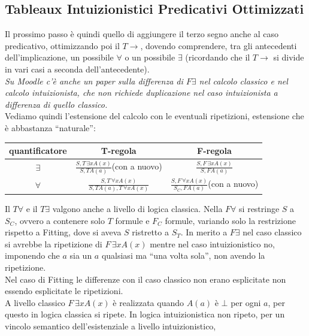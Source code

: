 \documentclass[a4paper,12pt, oneside]{book}
\begin{document}
\subsection{Tableaux Intuizionistici Predicativi Ottimizzati}
Il prossimo passo è quindi quello di aggiungere il terzo segno anche al caso
predicativo, ottimizzando poi il $T\to$, dovendo comprendere, tra gli
antecedenti dell'implicazione, un possibile $\forall$ o un possibile $\exists$
(ricordando che il $T\to$ si divide in vari casi a seconda dell'antecedente).\\
\textit{Su Moodle c'è anche un paper sulla differenza di $F\exists$ nel calcolo
  classico e nel calcolo intuizionista, che non richiede duplicazione nel caso
  intuizionista a differenza di quello classico.}\\
Vediamo quindi l'estensione del calcolo con le eventuali ripetizioni, estensione
che è abbastanza ``naturale'': 
\begin{table}[H]
  \centering
  \Large
  \begin{tabular}{c||c|c}
    quantificatore & T-regola & F-regola\\
    \hline
    $\exists$ & $\frac{S,T\,\exists x A(x)}{S,TA(a)}${\small{(con a nuovo)}}
                              & $\frac{S,F\,\exists x A(x)}{S,FA(a)}$\\
    \hline
    $\forall$ & $\frac{S,T\,\forall x A(x)}{S,TA(a),T\,\forall x A(x)}$
                              & $\frac{S,F\,\forall x A(x)}{S_C,
                                FA(a)}${\small{(con a nuovo)}}\\
    \hline
  \end{tabular}
\end{table}
Il $T\forall$ e il $T\exists$ valgono anche a livello di logica classica. Nella
$F\forall$ si restringe $S$ a $S_C$, ovvero a contenere solo $T$ formule e $F_C$
formule, variando solo la restrizione rispetto a Fitting, dove si aveva $S$
ristretto a $S_T$. In merito a $F\exists$ nel caso classico si avrebbe la
ripetizione di $F\,\exists x A(x)$ mentre nel caso intuizionistico no, imponendo
che $a$ sia un $a$ qualsiasi ma ``una volta sola'', non avendo la ripetizione.\\
Nel caso di Fitting le differenze con il caso classico non erano esplicitate non
essendo esplicitate le ripetizioni.\\
A livello classico $F\,\exists x A(x)$ è realizzata quando $A(a)$ è $\bot$ per
ogni $a$, per questo in logica classica si ripete. In logica intuizionistica non
ripeto, per un vincolo semantico dell'esistenziale a livello intuizionistico,
\end{document}
